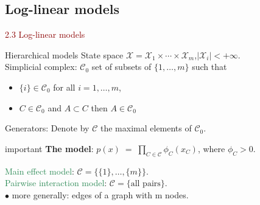 \documentclass[dvipsnames,aspectratio=169]{beamer} %
\newcommand{\cC}{\mathcal{C}}
\newcommand{\cX}{\mathcal{X}}
\begin{document}
\subsection{Log-linear models}

\begin{frame}{}
\begin{center}
	{\huge \textcolor{DarkRed}{2.3 Log-linear models}}
\end{center}
\end{frame}


\begin{frame}{Hierarchical models}
	State space $\cX=\cX_1\times \cdots\times \cX_m$,\quad  $|\cX_i|<+\infty$.\\[.2cm]
	Simplicial complex: $\cC_0$ set of subsets of $\{1,\ldots,m\}$ such that
	\begin{itemize}
	\item $\{i\}\in \cC_0$ for all $i=1,\ldots,m$,
	\item $C\in \cC_0$ and $A\subset C$ then $A\in \cC_0$
\end{itemize}

	\alert{Generators}: Denote by $\cC$ the maximal elements of $\cC_0$.\\[.4cm]
	

	\begin{beamercolorbox}[wd=\paperwidth,sep=3pt]{important}
		\textbf{The model}: $p(x)\;=\;\prod_{C\in \cC} \phi_C(x_C)$, \;\;where $\phi_C>0$.
	\end{beamercolorbox}
	\bigskip
	
	\textcolor{SeaGreen}{Main effect model}: $\cC=\{\{1\},\ldots,\{m\}\}$.\\[.3cm]
	\textcolor{SeaGreen}{Pairwise interaction model}: $\cC=\{\mbox{all pairs}\}$.\\
	\qquad $\bullet$ more generally: edges of a graph with m nodes.
\end{frame}
\end{document}
